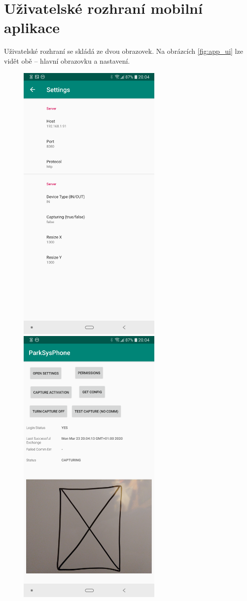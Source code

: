 \section{Uživatelské rozhraní mobilní aplikace}

\noindent
Uživatelské rozhraní se skládá ze dvou obrazovek. Na obrázcích \ref{fig:app_ui}
lze vidět obě -- hlavní obrazovku a nastavení.

\begin{figure}[!htb] \centering
  \includegraphics[width=70mm]{../img/app_settings.png}
  \includegraphics[width=70mm]{../img/app_mainscreen.png}

\end{figure}
